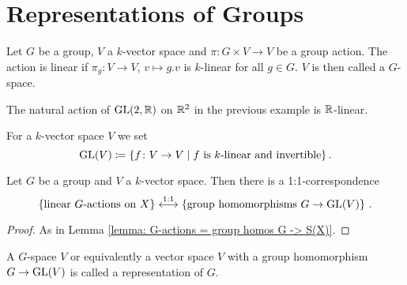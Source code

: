 \section{Representations of Groups}


\begin{definition}
  Let $G$ be a group, $V$ a $k$-vector space and $\pi \colon G \times V \to V$ be a group action.
  The action is linear if $\pi_g \colon V \to V$, $v \mapsto g.v$ is $k$-linear for all $g \in G$.
  $V$ is then called a $G$-space.
\end{definition}


\begin{expl}
  The natural action of $\operatorname{GL}(2,\mathbb{R})$ on $\mathbb{R}^2$ in the previous example is $\mathbb{R}$-linear.
\end{expl}


For a $k$-vector space $V$ we set
\[
            \operatorname{GL}(V)
  \coloneqq \{
              f \colon V \to V
            \mid
              f \text{ is $k$-linear and invertible}
            \} \,.
\]


\begin{lemma}
  Let $G$ be a group and $V$ a $k$-vector space.
  Then there is a 1:1-correspondence
  \[
    \left\{
      \text{linear $G$-actions on $X$}
    \right\}
    \overset{1:1}{\longleftrightarrow}
    \left\{
      \text{group homomorphisms $G \to \operatorname{GL}(V)$}
    \right\} \,.
  \]
\end{lemma}
\begin{proof}
  As in Lemma \ref{lemma: G-actions = group homos G -> S(X)}.
\end{proof}


\begin{rem}
  A $G$-space $V$ or equivalently a vector space $V$ with a group homomorphism $G \to \operatorname{GL}(V)$ is called a representation of $G$.
\end{rem}


